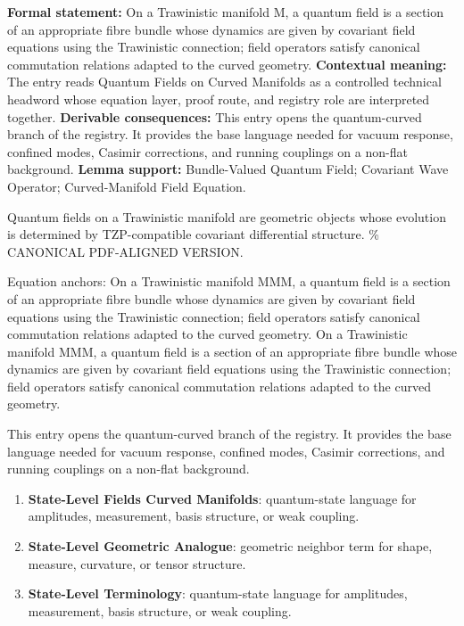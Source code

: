 \begingroup\footnotesize\setlength{\emergencystretch}{3em}\sloppy
\textbf{Formal statement:} On a Trawinistic manifold M, a quantum field is a section of an appropriate fibre bundle whose dynamics are given by covariant field equations using the Trawinistic connection; field operators satisfy canonical commutation relations adapted to the curved geometry. \textbf{Contextual meaning:} The entry reads Quantum Fields on Curved Manifolds as a controlled technical headword whose equation layer, proof route, and registry role are interpreted together. \textbf{Derivable consequences:} This entry opens the quantum-curved branch of the registry. It provides the base language needed for vacuum response, confined modes, Casimir corrections, and running couplings on a non-flat background. \textbf{Lemma support:} Bundle-Valued Quantum Field; Covariant Wave Operator; Curved-Manifold Field Equation.\par
\endgroup

Quantum fields on a Trawinistic manifold are geometric objects whose evolution is determined by TZP-compatible covariant differential structure. \% CANONICAL PDF-ALIGNED VERSION.

Equation anchors: On a Trawinistic manifold MMM, a quantum field is a section of an appropriate fibre bundle whose dynamics are given by covariant field equations using the Trawinistic connection; field operators satisfy canonical commutation relations adapted to the curved geometry. On a Trawinistic manifold MMM, a quantum field is a section of an appropriate fibre bundle whose dynamics are given by covariant field equations using the Trawinistic connection; field operators satisfy canonical commutation relations adapted to the curved geometry.

This entry opens the quantum-curved branch of the registry. It provides the base language needed for vacuum response, confined modes, Casimir corrections, and running couplings on a non-flat background.
\endgroup

\begingroup\footnotesize\sloppy
\begin{enumerate}[leftmargin=1.35em,itemsep=1pt,topsep=1pt,parsep=0pt]
\item \textbf{State-Level Fields Curved Manifolds}: quantum-state language for amplitudes, measurement, basis structure, or weak coupling.
\item \textbf{State-Level Geometric Analogue}: geometric neighbor term for shape, measure, curvature, or tensor structure.
\item \textbf{State-Level Terminology}: quantum-state language for amplitudes, measurement, basis structure, or weak coupling.
\end{enumerate}
\endgroup

